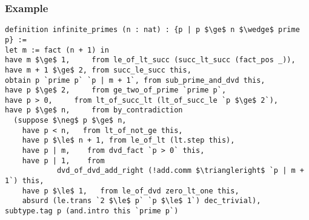 \documentclass{beamer}
\newcommand{\RR}{\mathbb{R}}
\begin{document}
%
%
%
%
%                       
%
%
%
%


\begin{frame}[fragile]
\frametitle{Example}
\begin{lstlisting}[basicstyle=\small]
definition infinite_primes (n : nat) : {p | p $\ge$ n $\wedge$ prime p} :=
let m := fact (n + 1) in
have m $\ge$ 1,     from le_of_lt_succ (succ_lt_succ (fact_pos _)),
have m + 1 $\ge$ 2, from succ_le_succ this,
obtain p `prime p` `p | m + 1`, from sub_prime_and_dvd this,
have p $\ge$ 2,     from ge_two_of_prime `prime p`,
have p > 0,     from lt_of_succ_lt (lt_of_succ_le `p $\ge$ 2`),
have p $\ge$ n,     from by_contradiction
  (suppose $\neg$ p $\ge$ n,
    have p < n,   from lt_of_not_ge this,
    have p $\le$ n + 1, from le_of_lt (lt.step this),
    have p | m,    from dvd_fact `p > 0` this,
    have p | 1,    from 
            dvd_of_dvd_add_right (!add.comm $\triangleright$ `p | m + 1`) this,
    have p $\le$ 1,   from le_of_dvd zero_lt_one this,
    absurd (le.trans `2 $\le$ p` `p $\le$ 1`) dec_trivial),
subtype.tag p (and.intro this `prime p`)
\end{lstlisting}
\end{frame}
\end{document}
